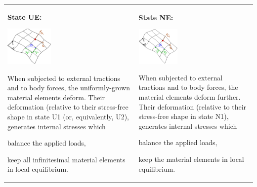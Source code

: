 \tabulinesep=1mm
\begin{longtabu} spread 0pt [c]{*{2}{|X[-1]}|}
\hline
\begin{center}{\bfseries State UE\+:}\end{center} 

 
\begin{DoxyImageNoCaption}
  \mbox{\includegraphics[width=0.35\textwidth]{Isotropic_growth_UE}}
\end{DoxyImageNoCaption}
 When subjected to external tractions and to body forces, the uniformly-\/grown material elements deform. Their deformation (relative to their stress-\/free shape in state U1 (or, equivalently, U2), generates internal stresses which
\begin{DoxyItemize}
\item balance the applied loads,
\item keep all infinitesimal material elements in local equilibrium.  
\end{DoxyItemize}&\begin{center}{\bfseries State NE\+:}\end{center} 

 
\begin{DoxyImageNoCaption}
  \mbox{\includegraphics[width=0.35\textwidth]{Isotropic_growth_NE}}
\end{DoxyImageNoCaption}
 When subjected to external tractions and to body forces, the material elements deform further. Their deformation (relative to their stress-\/free shape in state N1), generates internal stresses which
\begin{DoxyItemize}
\item balance the applied loads,
\item keep the material elements in local equilibrium.   
\end{DoxyItemize}\\
\end{longtabu}


